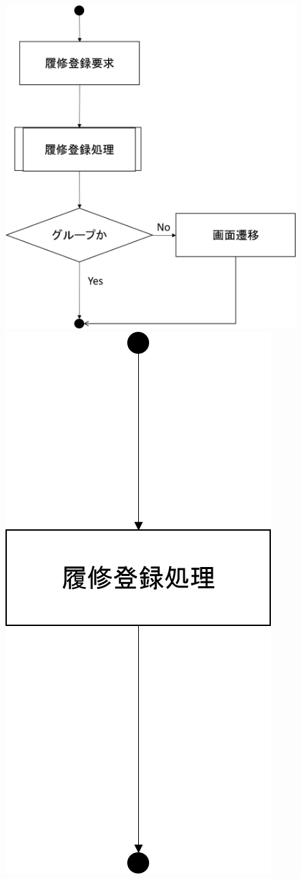 \begin{figure}[htbp]
 \begin{minipage}{0.5\hsize}
  \begin{center}
   \includegraphics[width=1\linewidth,clip]{./img/login/sub4.png}
  \end{center}
 \end{minipage}
 \begin{minipage}{0.5\hsize}
  \begin{center}
   \includegraphics[width=0.5\linewidth,clip]{./img/login/sub5.png}

\end{center}
\end{minipage}
\end{figure}

